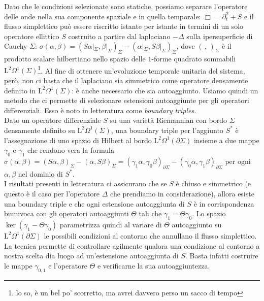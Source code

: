 \documentclass[11pt,a4paper]{article}
\begin{document}
	Dato che le condizioni selezionate sono statiche, possiamo separare l'operatore delle onde nella sua componente spaziale e in quella temporale: $\Box=\partial_t^2+S$ e il flusso simplettico può essere riscritto istante per istante in termini di un solo operatore ellittico $S$ costruito a partire dal laplaciano $-\Delta$ sulla ipersuperficie di Cauchy $\Sigma$: $\sigma(\alpha,\beta)=(S\alpha|_\Sigma,\beta|_\Sigma)_\Sigma-(\alpha|_\Sigma,S\beta|_\Sigma)_\Sigma$, dove $(\,,\,)_\Sigma$ è il prodotto scalare hilbertiano nello spazio delle $1$-forme quadrato sommabili $\mathrm{L}^2\Omega^1(\Sigma)$\footnote{lo so, è un bel po' scorretto, ma avrei davvero perso un sacco di tempo}. Al fine di ottenere un'evoluzione temporale unitaria del sistema, però, non ci basta che il laplaciano sia simmetrico come operatore densamente definito in $\mathrm{L}^2\Omega^1(\Sigma)$: è anche necessario che sia autoaggiunto. Usiamo quindi un metodo che ci permette di selezionare estensioni autoaggiunte per gli operatori differenziali. Esso è noto in letteratura come \emph{boundary triples}.\\
	
	Dato un operatore differenziale $S$ su una varietà Riemannian con bordo $\Sigma$ densamente definito su $\mathrm{L}^2\Omega^1(\Sigma)$, una boundary triple per l'aggiunto $S^*$ è l'assegnazione di uno spazio di Hilbert al bordo $\mathrm{L}^2\Omega^1(\partial\Sigma)$ insieme a due mappe $\gamma_0$ e $\gamma_1$ che rendono vera la formula
	$\sigma(\alpha,\beta)=(S\alpha,\beta)_\Sigma-(\alpha,S\beta)_\Sigma=(\gamma_1 \alpha,\gamma_0\beta)_{\partial\Sigma}-(\gamma_0 \alpha,\gamma_1\beta)_{\partial\Sigma}$ per ogni $\alpha,\beta$ nel dominio di $S^*$.\\
	I risultati presenti in letteratura ci assicurano che se $S$ è chiuso e simmetrico (e questo è il caso per l'operatore $\Delta$ che prendiamo in considerazione), allora esiste una boundary triple e che ogni estensione autoaggiunta di $S$ è in corrispondenza biunivoca con gli operatori autoaggiunti $\Theta$ tali che $\gamma_1=\Theta\gamma_0$. Lo spazio $\ker(\gamma_1-\Theta\gamma_0)$ parametrizza quindi al variare di $\Theta$ autoaggiunto su $\mathrm{L}^2\Omega^1(\partial\Sigma)$ le possibili condizioni al contorno che annullano il flusso simplettico. La tecnica permette di controllare agilmente qualora una condizione al contorno a nostra scelta dia luogo ad un'estensione autoaggiunta di $S$. Basta infatti costruire le mappe $\gamma_{0,1}$ e l'operatore $\Theta$ e verificarne la sua autoaggiuntezza.\\
	
\end{document}
